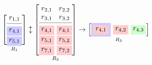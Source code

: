 \documentclass{article}
\begin{document}
\begin{figure}
\begin{subfigure}{.34\textwidth}
    \begin{center}
    \end{center}
  \end{subfigure}
  \begin{subfigure}{.64\textwidth}
    \begin{center}
      \begin{equation*}
        \underset{R_1}{\begin{bmatrix}
            r_{1,1} \\
            \cmidrule(lr){1-1}
            \colorbox{blue!20}{$r_{4,1}$} \\
            \colorbox{blue!20}{$r_{5,1}$}
          \end{bmatrix}}
        \updownarrow
        \underset{R_2}{\begin{bmatrix}
            r_{2,1} & \!\!\!\!r_{2,2} \\
            r_{3,1} & \!\!\!\!r_{3,2} \\
            \cmidrule(lr){1-2}
            \colorbox{red!20}{$r_{4,1}$} & \!\!\!\!\colorbox{red!20}{$r_{4,1}$} \\
            \colorbox{red!20}{$r_{5,1}$} & \!\!\!\!\colorbox{red!20}{$r_{5,2}$} \\
            \colorbox{red!20}{$r_{7,1}$} & \!\!\!\!\colorbox{red!20}{$r_{7,2}$} \\
\end{bmatrix}}
        \rightarrow
        \underset{R_3}{\begin{bmatrix}
            \colorbox{blue!20}{\colorbox{red!20}{$r_{4,1}$}} & \!\!\!\!\colorbox{red!20}{$r_{4,2}$} & \!\!\!\!\colorbox{green!20}{$r_{4,3}$} \\

\end{bmatrix}}
\end{equation*}
\end{center}
\end{subfigure}
\end{figure}
\end{document}
